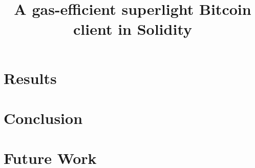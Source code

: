 \documentclass{article}
\title{A gas-efficient superlight Bitcoin client in Solidity}
\begin{document}
\maketitle









\section{Results}

\section{Conclusion}

\section{Future Work}
\end{document}
